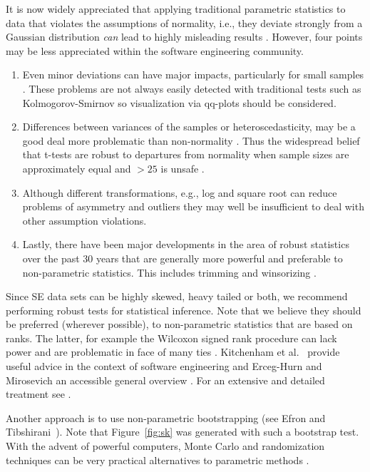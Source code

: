\documentclass[10pt]{elsarticle}
\newcommand{\RED}{\color{black}}
\newcommand{\BLACK}{\color{black}}
\begin{document}
It is now widely appreciated that applying traditional parametric statistics to data that violates the assumptions of normality, i.e., they deviate strongly from a Gaussian distribution \textit{can} lead to highly misleading results \cite{Kitc02}.  However, four points may be less appreciated within the software engineering community. 
\begin{enumerate}
    \item Even minor deviations can have major impacts, particularly for small samples \cite{Wilc12}.  These problems are not always easily detected with traditional tests such as Kolmogorov-Smirnov so visualization via qq-plots should be considered.
\item Differences between variances of the samples or heteroscedasticity, may be a good deal more problematic than non-normality \cite{Erce08}. Thus the widespread belief that t-tests are robust to departures from normality when sample sizes are approximately equal and $>25$ is unsafe \cite{Erce08,Zimm98}.  
\RED \item Although different transformations, e.g., log and square root can reduce problems of asymmetry and outliers they may well be insufficient to deal with other assumption violations. \BLACK
\item Lastly, there have been major developments in the area of robust statistics over the past 30 years that are generally more powerful and preferable to non-parametric statistics.  This includes trimming and winsorizing \cite{Hoag83,Kitc17}.
\end{enumerate}

Since SE data sets can be highly skewed, heavy tailed or both, \RED we recommend performing robust tests for statistical inference. Note that we believe they should be preferred (wherever possible), to non-parametric statistics that are based on ranks. The latter, \BLACK for example the Wilcoxon signed rank procedure can lack power and are problematic in face of many ties \cite{Blai85}.  Kitchenham et al.~\cite{Kitc17} provide useful advice in the context of software engineering and Erceg-Hurn and Mirosevich an accessible general overview \cite{Erce08}.  For an extensive and detailed treatment see \cite{Wilc12}.  

Another approach is to use non-parametric bootstrapping (see Efron and Tibshirani~\cite[p220-223]{efron93}). Note that  Figure~\ref{fig:sk} was generated with such a bootstrap test.  With the advent of powerful computers, Monte Carlo and randomization techniques can be very practical alternatives to parametric methods \cite{Manl97}.  %
\end{document}
